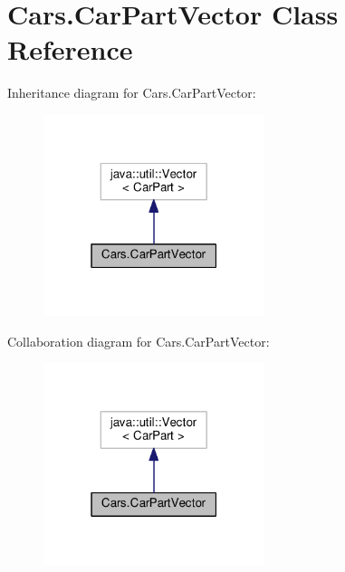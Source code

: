 \hypertarget{classCars_1_1CarPartVector}{}\section{Cars.\+Car\+Part\+Vector Class Reference}
\label{classCars_1_1CarPartVector}


Inheritance diagram for Cars.\+Car\+Part\+Vector\+:\nopagebreak
\begin{figure}[H]
\begin{center}
\leavevmode
\includegraphics[width=183pt]{classCars_1_1CarPartVector__inherit__graph}
\end{center}
\end{figure}


Collaboration diagram for Cars.\+Car\+Part\+Vector\+:\nopagebreak
\begin{figure}[H]
\begin{center}
\leavevmode
\includegraphics[width=183pt]{classCars_1_1CarPartVector__coll__graph}
\end{center}
\end{figure}
